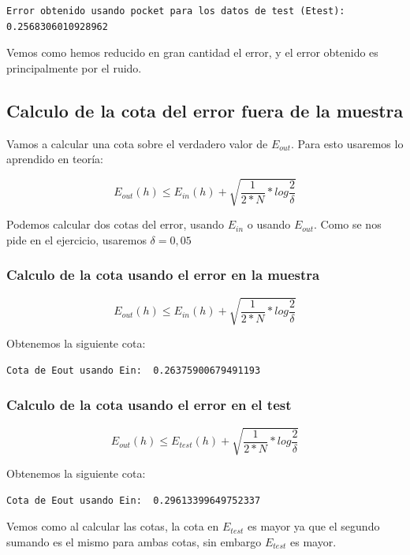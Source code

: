 \documentclass[12pt, spanish]{article}
\begin{document}
\begin{lstlisting}
Error obtenido usando pocket para los datos de test (Etest):  0.2568306010928962
\end{lstlisting}


Vemos como hemos reducido en gran cantidad el error, y el error obtenido es principalmente por el ruido.


\subsection{Calculo de la cota del error fuera de la muestra}

Vamos a calcular una cota sobre el verdadero valor de $E_{out}$. Para esto usaremos lo aprendido en teoría:

$$ E_{out}(h) \leq E_{in}(h) + \sqrt{\frac{1}{2*N}*log\frac{2}{\delta}} $$

Podemos calcular dos cotas del error, usando $E_{in}$ o usando $E_{out}$. Como se nos pide en el ejercicio, usaremos $\delta = 0,05$

\subsubsection{Calculo de la cota usando el error en la muestra}

$$ E_{out}(h) \leq E_{in}(h) + \sqrt{\frac{1}{2*N}*log\frac{2}{\delta}} $$

Obtenemos la siguiente cota:

\begin{lstlisting}
Cota de Eout usando Ein:  0.26375900679491193
\end{lstlisting}



\subsubsection{Calculo de la cota usando el error en el test}

$$ E_{out}(h) \leq E_{test}(h) + \sqrt{\frac{1}{2*N}*log\frac{2}{\delta}} $$

Obtenemos la siguiente cota:

\begin{lstlisting}
Cota de Eout usando Ein:  0.29613399649752337
\end{lstlisting}

Vemos como al calcular las cotas, la cota en $E_{test}$ es mayor ya que el segundo sumando es el mismo para ambas cotas, sin embargo $E_{test}$ es mayor.
\end{document}
